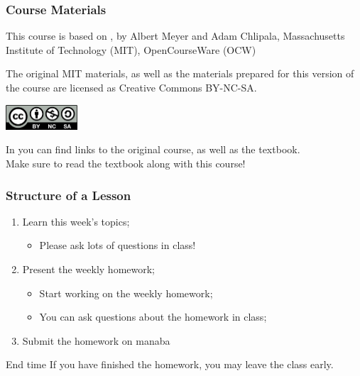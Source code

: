 \documentclass[aspectratio=169]{beamer}
\begin{document}
\begin{frame}
  \frametitle{Course Materials}


  This course is based on , by Albert Meyer and Adam Chlipala, Massachusetts Institute of Technology (MIT), OpenCourseWare (OCW)

  \bigskip

  The original MIT materials, as well as the materials prepared for this   version of the course are licensed as Creative Commons BY-NC-SA.

  \bigskip

  \begin{center}
    \includegraphics[width=0.2\textwidth]{../img/by-nc-sa}
  \end{center}

  \bigskip

  In  you can find links to the original course, as well as the textbook.\\
  \alert{Make sure to read the textbook along with this course!}
\end{frame}

\begin{frame}
  \frametitle{Structure of a Lesson}

  \begin{enumerate}
    \item Learn this week's topics;
    \begin{itemize}
      \item Please ask lots of questions in class!
    \end{itemize}
    \item Present the weekly homework;
    \begin{itemize}
      \item Start working on the weekly homework;
      \item You can ask questions about the homework in class;
    \end{itemize}
    \item Submit the homework on manaba
  \end{enumerate}

  \bigskip
  \begin{block}{End time}
    If you have finished the homework, you may leave the class early.
  \end{block}
\end{frame}
\end{document}
